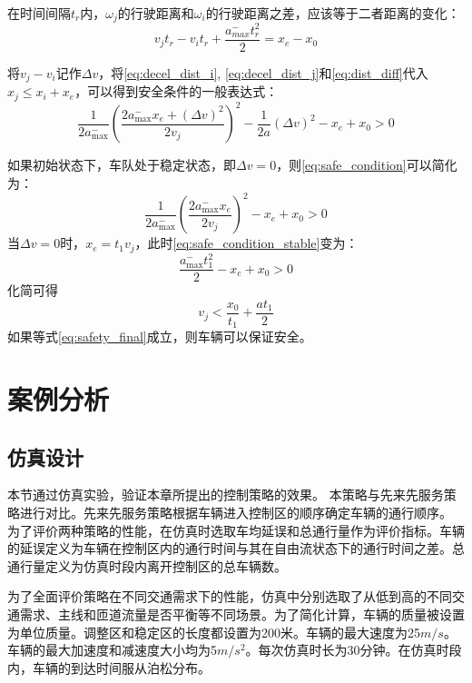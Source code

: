 在时间间隔$t_r$内，$\omega_j$的行驶距离和$\omega_i$的行驶距离之差，应该等于二者距离的变化：
\begin{equation}
    v_j t_r - v_i t_r + \frac{a_{max}^-t_r^2}{2} = x_e - x_0
    \label{eq:dist_diff}
\end{equation}

将$v_j-v_i$记作$\Delta v$，将\ref{eq:decel_dist_i}, \ref{eq:decel_dist_j}和\ref{eq:dist_diff}代入$x_j\leq x_i + x_e$，可以得到安全条件的一般表达式：
\begin{equation}
    \frac{1}{2 a_{\max }^{-}}\left(\frac{2 a_{\max }^{-} x_{e}+(\Delta v)^{2}}{2 v_{j}}\right)^{2}-\frac{1}{2 a}(\Delta v)^{2}-x_{e}+x_{0}>0
    \label{eq:safe_condition}
\end{equation}

如果初始状态下，车队处于稳定状态，即$\Delta v=0$，则\ref{eq:safe_condition}可以简化为：
\begin{equation}
    \frac{1}{2 a_{\max }^{-}}\left(\frac{2 a_{\max }^{-} x_{e}}{2 v_{j}}\right)^{2}-x_{e}+x_{0}>0
    \label{eq:safe_condition_stable}
\end{equation}
当$\Delta v=0$时，$x_e=t_1 v_j$，此时\ref{eq:safe_condition_stable}变为：
\begin{equation}
    \frac{a_{\max }^{-} t_{1}^{2}}{2}-x_{e}+x_{0}>0
    \label{eq:safe_condition_stable_xe}
\end{equation}
化简可得
\begin{equation}
    v_j < \frac{x_0}{t_1} + \frac{at_1}{2}
    \label{eq:safety_final}
\end{equation}
如果等式\ref{eq:safety_final}成立，则车辆可以保证安全。

\section{案例分析}

\subsection{仿真设计}
本节通过仿真实验，验证本章所提出的控制策略的效果。
本策略与先来先服务策略\cite{au2010motion}进行对比。先来先服务策略根据车辆进入控制区的顺序确定车辆的通行顺序。
为了评价两种策略的性能，在仿真时选取车均延误和总通行量作为评价指标。车辆的延误定义为车辆在控制区内的通行时间与其在自由流状态下的通行时间之差。总通行量定义为仿真时段内离开控制区的总车辆数。

为了全面评价策略在不同交通需求下的性能，仿真中分别选取了从低到高的不同交通需求、主线和匝道流量是否平衡等不同场景。为了简化计算，车辆的质量被设置为单位质量。调整区和稳定区的长度都设置为200米。车辆的最大速度为25$m/s$。车辆的最大加速度和减速度大小均为5$m/s^2$。每次仿真时长为30分钟。在仿真时段内，车辆的到达时间服从泊松分布。

